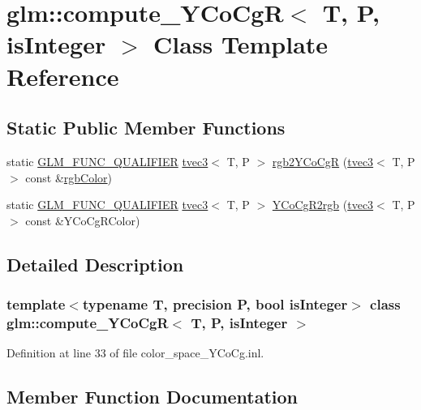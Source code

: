 \hypertarget{classglm_1_1compute___y_co_cg_r}{}\section{glm\+::compute\+\_\+\+Y\+Co\+CgR$<$ T, P, is\+Integer $>$ Class Template Reference}
\label{classglm_1_1compute___y_co_cg_r}
\subsection*{Static Public Member Functions}
\begin{DoxyCompactItemize}
\item 
static \mbox{\hyperlink{setup_8hpp_a33fdea6f91c5f834105f7415e2a64407}{G\+L\+M\+\_\+\+F\+U\+N\+C\+\_\+\+Q\+U\+A\+L\+I\+F\+I\+ER}} \mbox{\hyperlink{structglm_1_1tvec3}{tvec3}}$<$ T, P $>$ \mbox{\hyperlink{classglm_1_1compute___y_co_cg_r_af5f438f3ec49d12f350e6ed2bb1c896c}{rgb2\+Y\+Co\+CgR}} (\mbox{\hyperlink{structglm_1_1tvec3}{tvec3}}$<$ T, P $>$ const \&\mbox{\hyperlink{group__gtx__color__space_ga36b0619e31daf57bc4a54dac2dcf34b7}{rgb\+Color}})
\item 
static \mbox{\hyperlink{setup_8hpp_a33fdea6f91c5f834105f7415e2a64407}{G\+L\+M\+\_\+\+F\+U\+N\+C\+\_\+\+Q\+U\+A\+L\+I\+F\+I\+ER}} \mbox{\hyperlink{structglm_1_1tvec3}{tvec3}}$<$ T, P $>$ \mbox{\hyperlink{classglm_1_1compute___y_co_cg_r_a08e033fb9983afcffecc1b20de968715}{Y\+Co\+Cg\+R2rgb}} (\mbox{\hyperlink{structglm_1_1tvec3}{tvec3}}$<$ T, P $>$ const \&Y\+Co\+Cg\+R\+Color)
\end{DoxyCompactItemize}


\subsection{Detailed Description}
\subsubsection*{template$<$typename T, precision P, bool is\+Integer$>$\newline
class glm\+::compute\+\_\+\+Y\+Co\+Cg\+R$<$ T, P, is\+Integer $>$}



Definition at line 33 of file color\+\_\+space\+\_\+\+Y\+Co\+Cg.\+inl.



\subsection{Member Function Documentation}
\mbox{\label{classglm_1_1compute___y_co_cg_r_af5f438f3ec49d12f350e6ed2bb1c896c}} 

